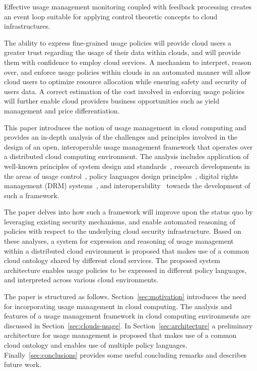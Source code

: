 \documentclass[times, 10pt,twocolumn]{article}
\begin{document}
Effective usage management monitoring coupled with feedback processing creates an event loop suitable for applying control theoretic concepts to cloud infrastructures.

The ability to express fine-grained usage policies will provide cloud users a greater trust regarding the usage of their data within clouds, and will provide them with confidence to employ cloud services. A mechanism to interpret, reason over, and enforce usage policies within clouds in an automated manner will allow cloud users to optimize resource allocation while ensuring safety and security of users data. A correct estimation of the cost involved in enforcing usage policies will further enable cloud providers business opportunities such as yield management and price differentiation. 

This paper introduces the notion of usage management in cloud computing and provides an in-depth analysis of the challenges and principles involved in the design of an open, interoperable usage management framework that operates over a distributed cloud computing environment. The analysis includes application of well-known principles of system design and standards~\cite{BlCl:01,Cl:88,ClWrSoBr:02}, research developments in the areas of usage control~\cite{PaSa:04,JaHeLa:10}, policy languages design principles~\cite{JaHeMa:06}, digital rights management (DRM) systems~\cite{JaHe:09},  and interoperability~\cite{JaHe:04,HeJa:05,KoLaMaMi:04,coral,marlin} towards the development of such a framework.

 The paper delves into how such a framework will improve upon the status quo by leveraging  existing security mechanisms, and enable automated reasoning of policies with respect to the underlying cloud security infrastructure. Based on these analyses, a system for expression and reasoning of usage management within a distributed cloud environment is proposed that makes use of a common cloud ontology shared by different cloud services. The proposed system architecture enables usage policies to be expressed in different policy languages, and interpreted across various cloud environments. 

The paper is structured as follows. Section~\ref{sec:motivation} introduces the need for incorporating usage management in cloud computing. The analysis and features of a usage management framework in cloud computing environments are discussed in Section~\ref{sec:clouds-usage}. In Section~\ref{sec:architecture} a preliminary architecture for usage management is proposed that makes use of a common cloud ontology and enables use of multiple policy languages. Finally~\ref{sec:conclusions} provides some useful concluding remarks and describes future work. 
\end{document}
